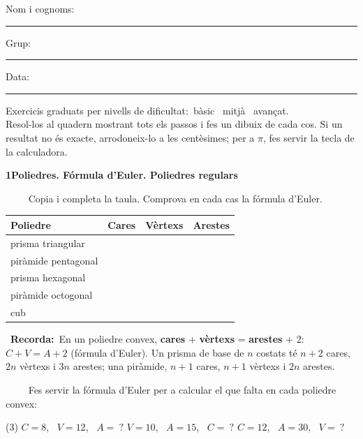 \documentclass[11pt,a4paper]{article}
\newcommand{\estrelles}[1]{{\color{accent}\ifcase#1\or\faStar\faStar[regular]\faStar[regular]\or\faStar\faStar\faStar[regular]\or\faStar\faStar\faStar\fi}}
\newcounter{exer}
\newcommand{\ex}[1]{\par\needspace{4\baselineskip}\medskip\stepcounter{exer}\noindent{\color{navy}\bfseries\theexer.}\ \ {\small\estrelles{#1}}\ \ }
\newcommand{\seccio}[2]{\par\needspace{10\baselineskip}\bigskip
  \begin{tcolorbox}[colback=navy,colframe=navy,coltext=white,arc=2mm,boxrule=0pt,left=3mm,right=3mm,top=1.2mm,bottom=1.2mm]
  {\large\bfseries #1\quad #2}
  \end{tcolorbox}\vspace{-2pt}}
\newcommand{\recorda}[1]{\par\smallskip\begin{tcolorbox}[colback=accent!7,colframe=accent!55,arc=2mm,boxrule=0.5pt,left=2.5mm,right=2.5mm,top=1mm,bottom=1mm]\small{\color{accent}\faLightbulb[regular]}\ \textbf{Recorda:}\ #1\end{tcolorbox}}
\begin{document}
\thispagestyle{primera}

\vspace{10pt}
Nom i cognoms: \rule{8.4cm}{0.4pt}\hfill Grup: \rule{1.6cm}{0.4pt}\hfill Data: \rule{2.2cm}{0.4pt}
\vspace{8pt}

\begin{tcolorbox}[colback=soft,colframe=soft,arc=2mm,left=3mm,right=3mm,top=1.5mm,bottom=1.5mm]
\small Exercicis graduats per nivells de dificultat:\quad \estrelles{1}\ bàsic \qquad \estrelles{2}\ mitjà \qquad \estrelles{3}\ avançat.\\[2pt] Resol-los al quadern mostrant tots els passos i fes un dibuix de cada cos. Si un resultat no és exacte, arrodoneix-lo a les centèsimes; per a $\pi$, fes servir la tecla de la calculadora.
\end{tcolorbox}

\seccio{1}{Poliedres. Fórmula d'Euler. Poliedres regulars}

\ex{1} Copia i completa la taula. Comprova en cada cas la fórmula d'Euler.\par\smallskip\begin{center}\renewcommand{\arraystretch}{1.25}\begin{tabular}{|l|C{1.6cm}|C{1.6cm}|C{1.6cm}|}\hline Poliedre & Cares & Vèrtexs & Arestes \\\hline prisma triangular & & &  \\\hline piràmide pentagonal & & &  \\\hline prisma hexagonal & & &  \\\hline piràmide octogonal & & &  \\\hline cub & & &  \\\hline\end{tabular}\end{center}\recorda{En un poliedre convex, \textbf{cares} + \textbf{vèrtexs} = \textbf{arestes} + 2: \ $C+V=A+2$ (fórmula d'Euler). Un prisma de base de $n$ costats té $n+2$ cares, $2n$ vèrtexs i $3n$ arestes; una piràmide, $n+1$ cares, $n+1$ vèrtexs i $2n$ arestes.}

\ex{1} Fes servir la fórmula d'Euler per a calcular el que falta en cada poliedre convex:\begin{tasks}(3)
  \task $C=8$, \ $V=12$, \ $A=\ ?$
  \task $V=10$, \ $A=15$, \ $C=\ ?$
  \task $C=12$, \ $A=30$, \ $V=\ ?$
\end{tasks}
\end{document}
